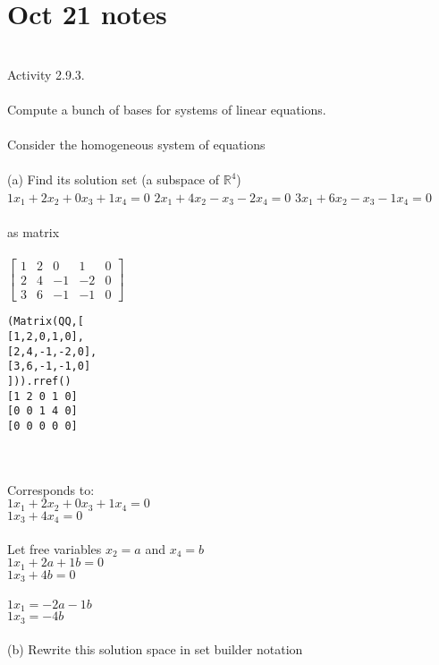 \documentclass{article}
\begin{document}
\section*{Oct 21 notes}\\
Activity 2.9.3.\\
\\
Compute a bunch of bases for systems of linear equations. \\
\\
Consider the homogeneous system of equations\\
\\
(a) Find its solution set (a subspace of $\mathbb{R}^{4}$)\\
$1x_{1} + 2x_{2} + 0x_{3} + 1x_{4} = 0$
$2x_{1} + 4x_{2} - x_{3} - 2x_{4} = 0$
$3x_{1} + 6x_{2} - x_{3} - 1x_{4} = 0$\\
\\
as matrix\\
\\
$ \left[ \begin{matrix} 
1 & 2 & 0 & 1 & 0\\
2 & 4 & -1 &-2 & 0\\
3 & 6 & -1 &-1 & 0
\end{matrix}\right]$
\\
\begin{verbatim}
(Matrix(QQ,[
[1,2,0,1,0],
[2,4,-1,-2,0],
[3,6,-1,-1,0]
])).rref()
[1 2 0 1 0]
[0 0 1 4 0]
[0 0 0 0 0]
\end{verbatim}\\
\\
Corresponds to:\\
$1x_{1} + 2x_{2} + 0x_{3} + 1x_{4} = 0$\\
$1x_{3} + 4x_{4} = 0$\\
\\
Let free variables  $x_{2} = a$ and $x_{4} = b$\\
$1x_{1} + 2a + 1b = 0$\\
$1x_{3} + 4b = 0$\\
\\
$1x_{1} =  -2a - 1b$\\
$1x_{3} = -4b $\\
\\
(b) Rewrite this solution space in set builder notation
\end{document}
